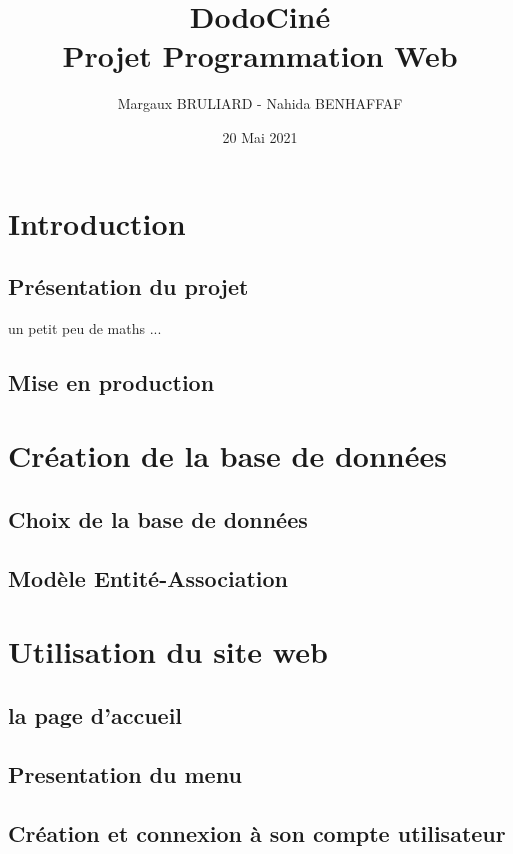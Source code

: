 \documentclass[a4paper, 11pt]{MyReport}
\author{Margaux BRULIARD - Nahida BENHAFFAF}
\title{DodoCiné \\ \vspace*{0.5cm}Projet Programmation Web}
\date{20 Mai 2021}
\begin{document}
	\begin{printTitle}
	\end{printTitle}

	\tableofcontents
	\newpage

	\chapter*{Introduction}
		
		\section*{Présentation du projet}

		un petit peu de maths ... 

		\section*{Mise en production}


	\chapter{Création de la base de données}

		\section{Choix de la base de données}
			
		\section{Modèle Entité-Association}


	\chapter{Utilisation du site web}

		\section{la page d'accueil}

		\section{Presentation du menu}

		\section{Création et connexion à son compte utilisateur}

\end{document}
